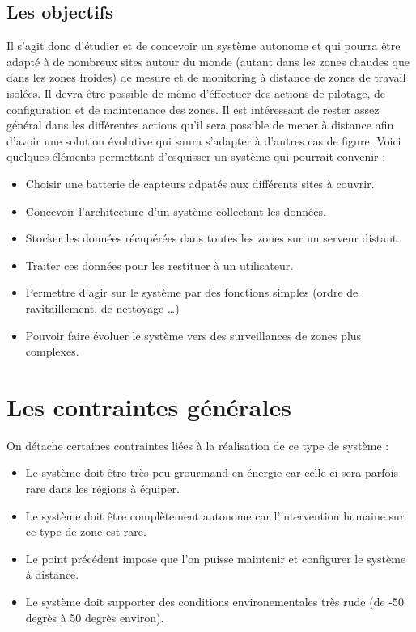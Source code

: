     \section{Les objectifs}
Il s'agit donc d'étudier et de concevoir un système autonome et qui pourra être adapté à de nombreux sites autour du monde (autant dans les zones chaudes que dans les zones froides) de mesure et de monitoring à distance de zones de travail isolées. Il devra être possible de même d'éffectuer des actions de pilotage, de configuration et de maintenance des zones. Il est intéressant de rester assez général dans les différentes actions qu'il sera possible de mener à distance afin d'avoir une solution évolutive qui saura s'adapter à d'autres cas de figure.
Voici quelques éléments permettant d'esquisser un système qui pourrait convenir :
\begin{itemize}
\item Choisir une batterie de capteurs adpatés aux différents sites à couvrir.
\item Concevoir l'architecture d'un système collectant les données.
\item Stocker les données récupérées dans toutes les zones sur un serveur distant.
\item Traiter ces données pour les restituer à un utilisateur.
\item Permettre d'agir sur le système par des fonctions simples (ordre de ravitaillement, de nettoyage …)
\item Pouvoir faire évoluer le système vers des surveillances de zones plus complexes.
\end{itemize}
    
    \chapter{Les contraintes générales}
On détache certaines contraintes liées à la réalisation de ce type de système :
\begin{itemize}
\item Le système doit être très peu grourmand en énergie car celle-ci sera parfois rare dans les régions à équiper.
\item Le système doit être complètement autonome car l'intervention humaine sur ce type de zone est rare.
\item Le point précédent impose que l'on puisse maintenir et configurer le système à distance.
\item Le système doit supporter des conditions environementales très rude (de -50 degrès à 50 degrès environ).
\end{itemize}

